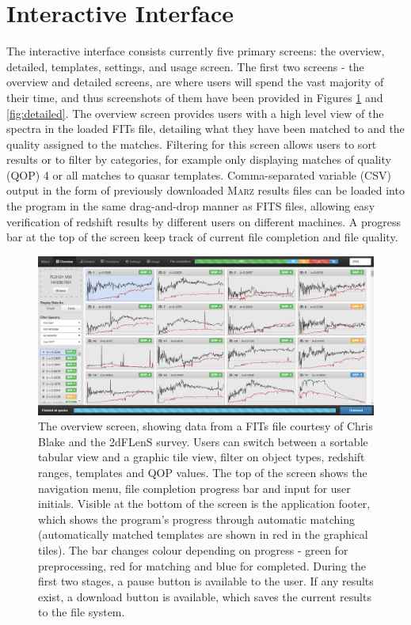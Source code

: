 \documentclass[iop]{emulateapj}
\newcommand{\marz}{\textsc{Marz}}
\begin{document}
\section{Interactive Interface}

The interactive interface consists currently five primary screens: the overview, detailed, templates, settings, and usage screen. The first two screens - the overview and detailed screens, are where users will spend the vast majority of their time, and thus screenshots of them have been provided in Figures \ref{fig:overview} and \ref{fig:detailed}. The overview screen provides users with a high level view of the spectra in the loaded FITs file, detailing what they have been matched to and the quality assigned to the matches. Filtering for this screen allows users to sort results or to filter by categories, for example only displaying matches of quality (QOP) 4 or all matches to quasar templates. Comma-separated variable (CSV) output in the form of previously downloaded \marz{} results files can be loaded into the program in the same drag-and-drop manner as FITS files, allowing easy verification of redshift results by different users on different machines. A progress bar at the top of the screen keep track of current file completion and file quality.\\



\begin{figure}[H]
\centering
\includegraphics[width=\textwidth]{InterfaceZ.png}
\caption{The overview screen, showing data from a FITs file courtesy of Chris Blake and the 2dFLenS survey. Users can switch between a sortable tabular view and a graphic tile view, filter on object types, redshift ranges, templates and QOP values. The top of the screen shows the navigation menu, file completion progress bar and input for user initials. Visible at the bottom of the screen is the application footer, which shows the program's progress through automatic matching (automatically matched templates are shown in red in the graphical tiles). The bar changes colour depending on progress - green for preprocessing, red for matching and blue for completed. During the first two stages, a pause button is available to the user. If any results exist, a download button is available, which saves the current results to the file system.}
\label{fig:overview}
\end{figure}
\end{document}
